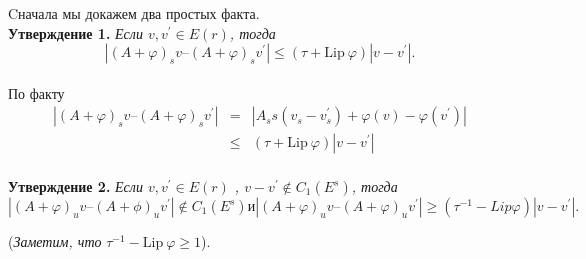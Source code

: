 \begin{demo}
Cначала мы докажем два простых факта.\\
\textbf{Утверждение 1.} \textit{Если $v, v^{\prime} \in E(r)$, тогда}
$$
|(A+ \varphi)_s v – (A+\varphi)_s v^{\prime} | \leq (\tau + \mathrm{Lip} \ \varphi) |v-v^{ \prime} |.
$$
\\
По факту 
$$
\begin{array}{lclll}
|(A + \varphi)_s v – (A + \varphi)_s v^{\prime} | & = & |A_ss  (v_s-v_s^{\prime}) + \varphi(v) - \varphi(v^{\prime})| \\
& \leq & (\tau + \mathrm{Lip} \ \varphi)|v-v^{\prime} |
\end{array}
$$
\\
\textbf{Утверждение 2.} \textit{Если $v, v^{\prime} \in E(r)$ ,  $ v-v^{\prime} \notin C_1(E^s)$, тогда}
$$
|(A + \varphi)_u v – (A + \phi)_u v^{\prime}| \notin C_1(E^s)
\textit{и}
|(A + \varphi)_u v – (A + \varphi)_u v^{\prime}| \geqslant (\tau^{-1} - Lip\varphi)|v-v^{\prime}|.
$$

(\textit{Заметим, что} $\tau^{-1} - \mathrm{Lip} \ \varphi \geqslant 1$).


\end{demo}
